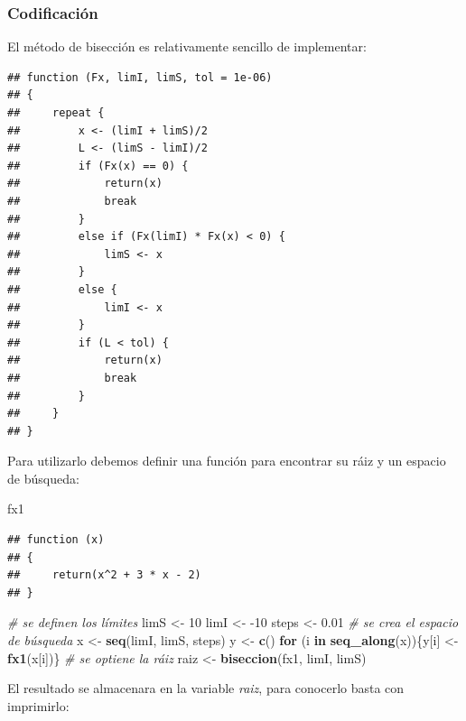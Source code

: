 \documentclass[11pt,]{article}
\newenvironment{Shaded}{\begin{snugshade}}{\end{snugshade}}
\newcommand{\CommentTok}[1]{\textcolor[rgb]{0.56,0.35,0.01}{\textit{#1}}}
\newcommand{\ControlFlowTok}[1]{\textcolor[rgb]{0.13,0.29,0.53}{\textbf{#1}}}
\newcommand{\DecValTok}[1]{\textcolor[rgb]{0.00,0.00,0.81}{#1}}
\newcommand{\FloatTok}[1]{\textcolor[rgb]{0.00,0.00,0.81}{#1}}
\newcommand{\KeywordTok}[1]{\textcolor[rgb]{0.13,0.29,0.53}{\textbf{#1}}}
\newcommand{\NormalTok}[1]{#1}
\newcommand{\StringTok}[1]{\textcolor[rgb]{0.31,0.60,0.02}{#1}}
\begin{document}
\newpage

\hypertarget{codificaciuxf3n}{%
\subsubsection{Codificación}\label{codificaciuxf3n}}

El método de bisección es relativamente sencillo de implementar:

\begin{verbatim}
## function (Fx, limI, limS, tol = 1e-06) 
## {
##     repeat {
##         x <- (limI + limS)/2
##         L <- (limS - limI)/2
##         if (Fx(x) == 0) {
##             return(x)
##             break
##         }
##         else if (Fx(limI) * Fx(x) < 0) {
##             limS <- x
##         }
##         else {
##             limI <- x
##         }
##         if (L < tol) {
##             return(x)
##             break
##         }
##     }
## }
\end{verbatim}

Para utilizarlo debemos definir una función para encontrar su ráiz y un
espacio de búsqueda:

\begin{Shaded}
\begin{Highlighting}[]
\NormalTok{fx1}
\end{Highlighting}
\end{Shaded}

\begin{verbatim}
## function (x) 
## {
##     return(x^2 + 3 * x - 2)
## }
\end{verbatim}

\begin{Shaded}
\begin{Highlighting}[]
\CommentTok{# se definen los límites}
\NormalTok{limS <-}\StringTok{ }\DecValTok{10}
\NormalTok{limI <-}\StringTok{ }\DecValTok{-10}
\NormalTok{steps <-}\StringTok{ }\FloatTok{0.01}
\CommentTok{# se crea el espacio de búsqueda}
\NormalTok{x <-}\StringTok{ }\KeywordTok{seq}\NormalTok{(limI, limS, steps)}
\NormalTok{y <-}\StringTok{ }\KeywordTok{c}\NormalTok{()}
\ControlFlowTok{for}\NormalTok{ (i }\ControlFlowTok{in} \KeywordTok{seq_along}\NormalTok{(x))\{y[i] <-}\StringTok{ }\KeywordTok{fx1}\NormalTok{(x[i])\}}
\CommentTok{# se optiene la ráiz}
\NormalTok{raiz <-}\StringTok{ }\KeywordTok{biseccion}\NormalTok{(fx1, limI, limS)}
\end{Highlighting}
\end{Shaded}

El resultado se almacenara en la variable \emph{raiz}, para conocerlo
basta con imprimirlo:
\end{document}
